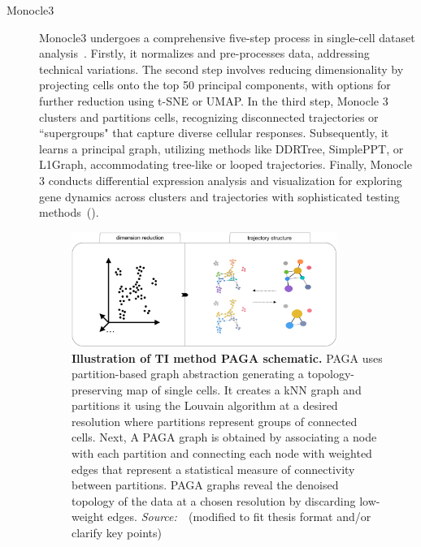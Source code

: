 \begin{description}
  \item[Monocle3]
  Monocle3 undergoes a comprehensive five-step process in single-cell dataset analysis~\citep{cao2019monocle3}. Firstly, it normalizes and pre-processes data, addressing technical variations. The second step involves reducing dimensionality by projecting cells onto the top 50 principal components, with options for further reduction using t-SNE or UMAP. In the third step, Monocle 3 clusters and partitions cells, recognizing disconnected trajectories or ``supergroups" that capture diverse cellular responses. Subsequently, it learns a principal graph, utilizing methods like DDRTree, SimplePPT, or L1Graph, accommodating tree-like or looped trajectories. Finally, Monocle 3 conducts differential expression analysis and visualization for exploring gene dynamics across clusters and trajectories with sophisticated testing methods~().

\begin{figure}[h!]
  	\centering
  	\includegraphics[width=0.85\textwidth]{TI_Alg_PAGA/fig}
  	\vspace{0.1cm}
  	\caption[Illustration of TI method PAGA schematic.]{\textbf{Illustration of TI method PAGA schematic.}
  	PAGA uses partition-based graph abstraction generating a topology-preserving map of single cells. It creates a kNN graph and partitions it using the Louvain algorithm at a desired resolution where partitions represent groups of connected cells. Next, A PAGA graph is obtained by associating a node with each partition and connecting each node with weighted edges that represent a statistical measure of connectivity between partitions. PAGA graphs reveal the denoised topology of the data at a chosen resolution by discarding low-weight edges. \emph{Source:~\cite{wolf2019paga}}~(modified to fit thesis format and/or clarify key points)
  	}
  	\label{fig:TI_Alg_PAGA}
\end{figure}


\end{description}
